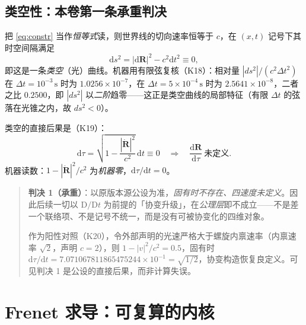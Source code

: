 \documentclass[UTF8,fontset=fandol,11pt]{ctexart}
\newcommand{\dd}{\mathrm{d}}
\newcommand{\DD}{\mathrm{D}}
\newcommand{\bx}{\boldsymbol}
\begin{document}
\subsection{类空性：本卷第一条承重判决}
把 \eqref{eq:constr} 当作\emph{恒等式}读，则世界线的切向速率恒等于 $c$，在 $(x,t)$ 记号下其时空间隔满足
\begin{equation}
  \dd s^2=|\dd\bx R|^2-c^2\dd t^2\equiv 0 ,
  \label{eq:null}
\end{equation}
即这是一条\emph{类空}（光）曲线。机器用有限弦复核（K18）：相对量 $|ds^2|/(c^2\Delta t^2)$ 在 $\Delta t=10^{-3}\,\mathrm{s}$ 时为 $1.0256\times10^{-7}$，在 $\Delta t=5\times10^{-4}\,\mathrm{s}$ 时为 $2.5641\times10^{-8}$，二者之比 $0.2500$，即 $|ds^2|$ 以\emph{二阶}趋零——这正是类空曲线的局部特征（有限 $\Delta t$ 的弦落在光锥之内，故 $ds^2<0$）。

类空的直接后果是（K19）：
\begin{equation}
  \dd\tau=\sqrt{1-\frac{|\dot{\bx R}|^2}{c^2}}\,\dd t\equiv 0
  \quad\Longrightarrow\quad
  \frac{\dd\bx R}{\dd\tau}\ \text{未定义}.
  \label{eq:dtau}
\end{equation}
机器读数：$1-|\dot{\bx R}|^2/c^2$ 为\emph{机器零}，$\dd\tau/\dd t=0$。

\begin{quote}
\textbf{判决 1（承重）}：以原版本源公设为准，\emph{固有时不存在、四速度未定义}。因此后续一切以 $\DD/\DD t$ 为前提的「协变升级」，在\emph{公理层}即不成立——不是差一个联络项、不是记号不统一，而是没有可被协变化的四维对象。

作为阳性对照（K20），令外部声明的光速严格大于螺旋内禀速率（内禀速率 $\sqrt2$，声明 $c=2$），则 $1-|v|^2/c^2=0.5$，固有时 $\dd\tau/\dd t=7.071067811865475244\times10^{-1}=\sqrt{1/2}$，协变构造恢复良定义。可见判决 1 是公设的直接后果，而非计算失误。
\end{quote}

\section{Frenet 求导：可复算的内核}
\label{sec:frenet}
\end{document}
